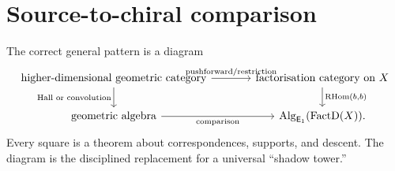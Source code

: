 \section{Source-to-chiral comparison}
The correct general pattern is a diagram
\[
\begin{tikzcd}[column sep=large]
 \text{higher-dimensional geometric category}
 \arrow[r,"\text{pushforward/restriction}"]
 \arrow[d,"\text{Hall or convolution}"']
 &\text{factorisation category on }X
 \arrow[d,"{\RHom(b,b)}"]\\
 \text{geometric algebra}
 \arrow[r,"\text{comparison}"']
 &\Alg_{\Eone}(\FactD(X)).
\end{tikzcd}
\]
Every square is a theorem about correspondences, supports, and descent.  The diagram is the disciplined replacement for a universal ``shadow tower.''
